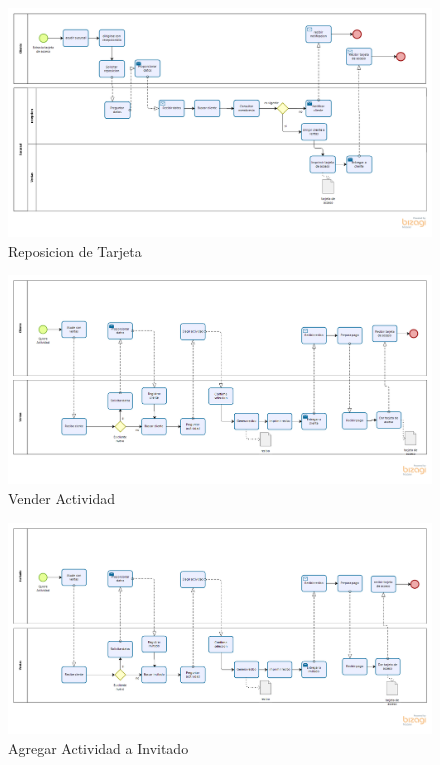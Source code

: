 \begin{figure}[htbp]
	\begin{center}
		\includegraphics[width=1.1\textwidth]{images/Procesos/ReponerTarjetaAcceso}
		\caption{Reposicion de Tarjeta}
	\end{center}
\end{figure}

\begin{figure}[htbp]
	\begin{center}
		\includegraphics[width=1.1\textwidth]{images/Procesos/VenderActividadCliente}
		\caption{Vender Actividad}
	\end{center}
\end{figure}

\begin{figure}[htbp]
	\begin{center}
		\includegraphics[width=1.1\textwidth]{images/Procesos/VenderActividadInvitado}
		\caption{Agregar Actividad a Invitado}
	\end{center}
\end{figure}


